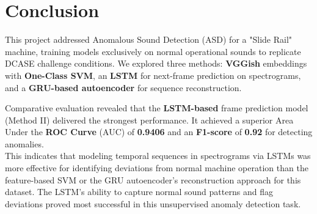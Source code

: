 \documentclass[ngerman]{scrartcl}
\begin{document}
\section{Conclusion}

This project addressed Anomalous Sound Detection (ASD) for a "Slide Rail" machine, training models exclusively on normal operational sounds to replicate DCASE challenge conditions. We explored three methods: \textbf{VGGish} embeddings with\textbf{ One-Class SVM}, an \textbf{LSTM} for next-frame prediction on spectrograms, and a \textbf{GRU-based autoencoder} for sequence reconstruction.

Comparative evaluation revealed that the\textbf{ LSTM-based} frame prediction model (Method II) delivered the strongest performance. It achieved a superior Area Under the \textbf{ROC Curve} (AUC) of \textbf{0.9406} and an \textbf{F1-score} of\textbf{ 0.92} for detecting anomalies.\\
This indicates that modeling temporal sequences in spectrograms via LSTMs was more effective for identifying deviations from normal machine operation than the feature-based SVM or the GRU autoencoder's reconstruction approach for this dataset. The LSTM's ability to capture normal sound patterns and flag deviations proved most successful in this unsupervised anomaly detection task.
\end{document}
